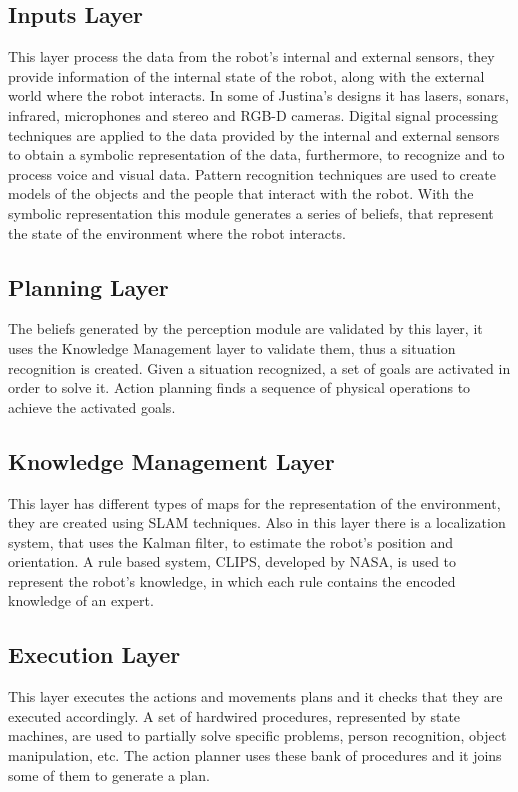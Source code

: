 \documentclass{llncs}
\begin{document}
\subsection{Inputs Layer}

This layer process the data from the robot's internal and external sensors, they provide information of the internal state of the robot, along with the external world where the robot interacts.
In some of Justina's designs it has lasers, sonars, infrared, microphones and stereo and RGB-D cameras.
Digital signal processing techniques are applied to the data provided by the internal and external sensors to obtain a symbolic representation of the data, furthermore, to recognize and to process voice and visual data.
Pattern recognition techniques are used to create models of the objects and the people that interact with the robot.
With the symbolic representation this module generates a series of beliefs, that represent the state of the environment where the robot interacts.


\subsection{Planning Layer}

The beliefs generated by the perception module are validated by this layer, it uses the Knowledge Management layer to validate them, thus a situation recognition is created.
Given a situation recognized, a set of goals are activated in order to solve it.
Action planning finds a sequence of physical operations to achieve the activated goals.


\subsection{Knowledge Management Layer}

This layer has different types of maps for the representation of the environment, they are created using 
SLAM techniques.
Also in this layer there is a localization system, that uses the Kalman filter, to estimate the robot's position and orientation.
A rule based system, CLIPS, developed by NASA, is used to represent the robot's knowledge, in which each rule contains the encoded knowledge of an expert.


\subsection{Execution Layer}
This layer executes the actions and movements plans and it checks that they are executed accordingly.
A set of hardwired procedures, represented by state machines, are used to partially solve specific problems, person recognition, object manipulation, etc. The action planner uses these bank of procedures and it joins some of them to generate a plan.
\end{document}
